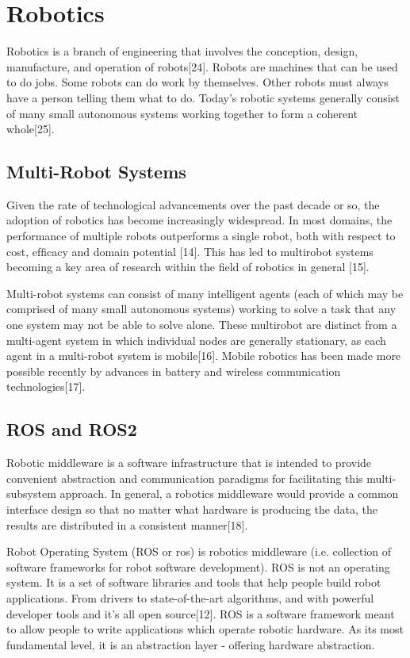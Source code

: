 \documentclass{mproj}
\begin{document}
\section{Robotics}
Robotics is a branch of engineering that involves the conception, design, manufacture, and operation of robots[24]. Robots are machines that can be used to do jobs. Some robots can do work by themselves. Other robots must always have a person telling them what to do. Today’s robotic systems generally consist of many small autonomous systems working together to form a coherent whole[25].
\subsection{Multi-Robot Systems}
Given the rate of technological advancements over the past decade or so, the adoption of robotics has become increasingly widespread. In most domains, the performance of multiple robots outperforms a single robot, both with respect to cost, efﬁcacy and domain potential [14]. This has led to multirobot systems becoming a key area of research within the ﬁeld of robotics in general [15].

Multi-robot systems can consist of many intelligent agents (each of which may be comprised of many small autonomous systems) working to solve a task that any one system may not be able to solve alone. These multirobot are distinct from a multi-agent system in which individual nodes are generally stationary, as each agent in a multi-robot system is mobile[16]. Mobile robotics has been made more possible recently by advances in battery and wireless communication technologies[17].

\subsection{ROS and ROS2}
Robotic middleware is a software infrastructure that is intended to provide convenient abstraction and communication paradigms for facilitating this multi-subsystem approach. In general, a robotics middleware would provide a common interface design so that no matter what hardware is producing the data, the results are distributed in a consistent manner[18].

Robot Operating System (ROS or ros) is robotics middleware (i.e. collection of software frameworks for robot software development). ROS is not an operating system. It is a set of software libraries and tools that help people build robot applications. From drivers to state-of-the-art algorithms, and with powerful developer tools and it’s all open source[12]. ROS is a software framework meant to allow people to write applications which operate robotic hardware. As its most fundamental level, it is an abstraction layer - offering hardware abstraction.  
\end{document}
